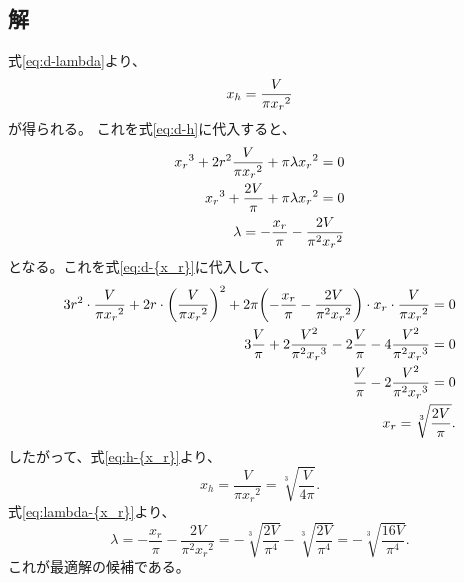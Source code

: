 \documentclass{jsarticle}
\begin{document}
\subsection{解}
式\eqref{eq:d-lambda}より、
\begin{equation}
  {x_h}=\frac{V}{\pi {x_r}^2}
  \label{eq:h-{x_r}}
\end{equation}
が得られる。
これを式\eqref{eq:d-h}に代入すると、
\begin{align}
  {x_r}^3 + 2r^2\frac{V}{\pi {x_r}^2} + \pi\lambda {x_r}^2 = 0 \\
  {x_r}^3 + \frac{2V}{\pi} + \pi\lambda {x_r}^2 = 0 \\
  \lambda = -\frac{{x_r}}{\pi} - \frac{2V}{\pi^2 {x_r}^2}
  \label{eq:lambda-{x_r}}
\end{align}
となる。これを式\eqref{eq:d-{x_r}}に代入して、
\begin{align}
  3r^2\cdot\frac{V}{\pi {x_r}^2} 
  + 2r\cdot\qty(\frac{V}{\pi {x_r}^2})^2 
  + 2\pi\qty(
    -\frac{{x_r}}{\pi} - \frac{2V}{\pi^2 {x_r}^2}
    )
    \cdot {x_r}\cdot
    \frac{V}{\pi {x_r}^2} = 0 \\
  3\frac{V}{\pi} 
  + 2\frac{V^2}{\pi^2 {x_r}^3} 
  - 2\frac{V}{\pi}
  - 4\frac{V^2}{\pi^2 {x_r}^3} = 0 \\
  \frac{V}{\pi} - 2\frac{V^2}{\pi^2 {x_r}^3} = 0 \\
  {x_r} = \sqrt[3]{\frac{2V}{\pi}}.
\end{align}
したがって、式\eqref{eq:h-{x_r}}より、
\begin{equation}
  {x_h} = \frac{V}{\pi {x_r}^2} 
  = \sqrt[3]{\frac{V}{4\pi}}.
\end{equation}
式\eqref{eq:lambda-{x_r}}より、
\begin{equation}
  \lambda = -\frac{{x_r}}{\pi} - \frac{2V}{\pi^2 {x_r}^2} 
  = -\sqrt[3]{\frac{2V}{\pi^4}} - \sqrt[3]{\frac{2V}{\pi^4}} 
  = -\sqrt[3]{\frac{16V}{\pi^4}}.
\end{equation}
これが最適解の候補である。
\end{document}
